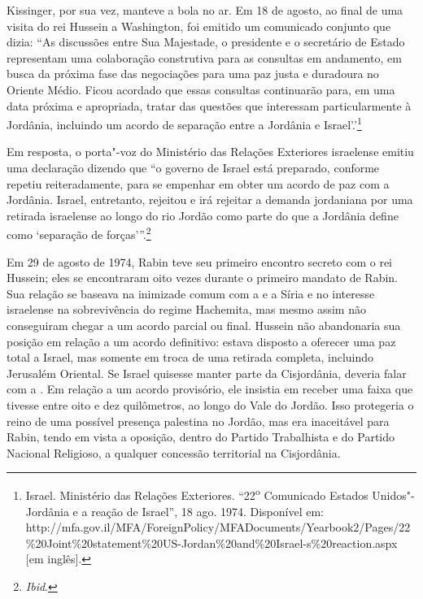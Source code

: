 Kissinger, por sua vez, manteve a bola no ar. Em 18 de agosto, ao final
de uma visita do rei Hussein a Washington, foi emitido um comunicado
conjunto que dizia: ``As discussões entre Sua Majestade, o presidente e
o secretário de Estado representam uma colaboração construtiva para as
consultas em andamento, em busca da próxima fase das negociações para
uma paz justa e duradoura no Oriente Médio. Ficou acordado que essas
consultas continuarão para, em uma data próxima e apropriada, tratar das
questões que interessam particularmente à Jordânia, incluindo um acordo
de separação entre a Jordânia e Israel'.'\footnote{Israel. Ministério das Relações Exteriores. 
``22\textsuperscript{o} Comunicado Estados Unidos"-Jordânia e a reação de Israel'', 18 ago. 1974. Disponível em: http://mfa.gov.il/MFA/ForeignPolicy/MFADocuments/Yearbook2/Pages/22\%20Joint\%20statement\%20US-Jordan\%20and\%20Israel-s\%20reaction.aspx
{[}em inglês{]}.}

Em resposta, o porta"-voz do Ministério das Relações Exteriores israelense
emitiu uma declaração dizendo que ``o governo de Israel está preparado,
conforme repetiu reiteradamente, para se empenhar em obter um acordo de
paz com a Jordânia. Israel, entretanto, rejeitou e irá rejeitar a
demanda jordaniana por uma retirada israelense ao longo do rio Jordão
como parte do que a Jordânia define como `separação de
forças'''.\footnote{\emph{Ibid}.}

Em 29 de agosto de 1974, Rabin teve seu primeiro encontro secreto com o
rei Hussein; eles se encontraram oito vezes durante o primeiro mandato
de Rabin. Sua relação se baseava na inimizade comum com a  e a Síria
e no interesse israelense na sobrevivência do regime Hachemita, mas
mesmo assim não conseguiram chegar a um acordo parcial ou final. Hussein
não abandonaria sua posição em relação a um acordo definitivo: estava
disposto a oferecer uma paz total a Israel, mas somente em troca de uma
retirada completa, incluindo Jerusalém Oriental. Se Israel quisesse
manter parte da Cisjordânia, deveria falar com a . Em relação a um
acordo provisório, ele insistia em receber uma faixa que tivesse entre
oito e dez quilômetros, ao longo do Vale do Jordão. Isso protegeria o
reino de uma possível presença palestina no Jordão, mas era inaceitável
para Rabin, tendo em vista a oposição, dentro do Partido Trabalhista e
do Partido Nacional Religioso, a qualquer concessão territorial na
Cisjordânia.

